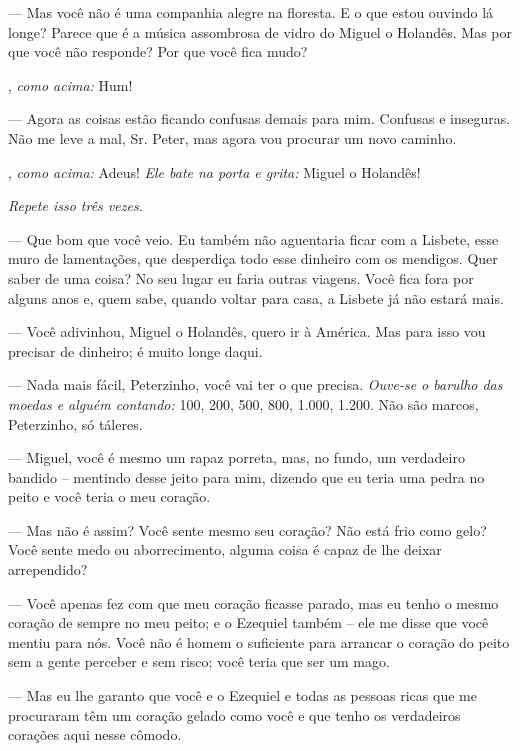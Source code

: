 \begin{myparindent}{0pt}
\begin{Parskip}
 --- Mas você não é uma companhia alegre na floresta. E o que
estou ouvindo lá longe? Parece que é a música assombrosa de vidro do
Miguel o Holandês. Mas por que você não responde? Por que você fica
mudo?

, \emph{como acima:} Hum!

 --- Agora as coisas estão ficando confusas demais para mim.
Confusas e inseguras. Não me leve a mal, Sr. Peter, mas agora vou
procurar um novo caminho.

, \emph{como acima:} Adeus! \emph{Ele bate na porta
e grita:} Miguel o Holandês!

\emph{Repete isso três vezes.}

 --- Que bom que você veio. Eu também não aguentaria
ficar com a Lisbete, esse muro de lamentações, que desperdiça todo esse
dinheiro com os mendigos. Quer saber de uma coisa? No seu lugar eu faria
outras viagens. Você fica fora por alguns anos e, quem sabe, quando
voltar para casa, a Lisbete já não estará mais.

 --- Você adivinhou, Miguel o Holandês, quero ir à
América. Mas para isso vou precisar de dinheiro; é muito longe daqui.

 --- Nada mais fácil, Peterzinho, você vai ter o que
precisa. \emph{Ouve-se o barulho das moedas e alguém contando:} 100,
200, 500, 800, 1.000, 1.200. Não são marcos, Peterzinho, só táleres.

 --- Miguel, você é mesmo um rapaz porreta, mas, no
fundo, um verdadeiro bandido -- mentindo desse jeito para mim, dizendo
que eu teria uma pedra no peito e você teria o meu coração.

 --- Mas não é assim? Você sente mesmo seu coração? Não
está frio como gelo? Você sente medo ou aborrecimento, alguma coisa é
capaz de lhe deixar arrependido?

 --- Você apenas fez com que meu coração ficasse
parado, mas eu tenho o mesmo coração de sempre no meu peito; e o
Ezequiel também -- ele me disse que você mentiu para nós. Você não é
homem o suficiente para arrancar o coração do peito sem a gente perceber
e sem risco; você teria que ser um mago.

 --- Mas eu lhe garanto que você e o Ezequiel e todas as
pessoas ricas que me procuraram têm um coração gelado como você e que
tenho os verdadeiros corações aqui nesse cômodo.


\end{Parskip}
\end{myparindent}
